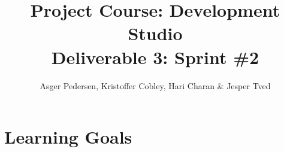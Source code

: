 \documentclass[]{article}
\title{ Project Course: Development Studio \\ Deliverable 3: Sprint \#2}
\author{ Asger Pedersen, Kristoffer Cobley, Hari Charan \& Jesper Tved }
\begin{document}
\ifpdf
{}
\else
{}
\fi

\maketitle
\setcounter{tocdepth}{1}
\tableofcontents
\newpage




\section{Learning Goals} %
\label{sec:Learning Goals}









\end{document}
